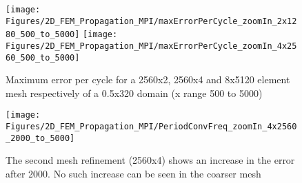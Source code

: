 \begin{figure}
    \begin{centering}
\texttt{[image: Figures/2D\_FEM\_Propagation\_MPI/maxErrorPerCycle\_zoomIn\_2x1280\_500\_to\_5000]}
\texttt{[image: Figures/2D\_FEM\_Propagation\_MPI/maxErrorPerCycle\_zoomIn\_4x2560\_500\_to\_5000]}
\caption{Maximum error per cycle for a 2560x2, 2560x4 and 8x5120 element mesh respectively of a 0.5x320 domain (x range 500 to 5000)}
\end{centering}
\end{figure}


\begin{figure}
\texttt{[image: Figures/2D\_FEM\_Propagation\_MPI/PeriodConvFreq\_zoomIn\_4x2560\_2000\_to\_5000]}
\caption{The second mesh refinement (2560x4) shows an increase in the error after 2000. No such increase can be seen in the coarser mesh}
\end{figure}